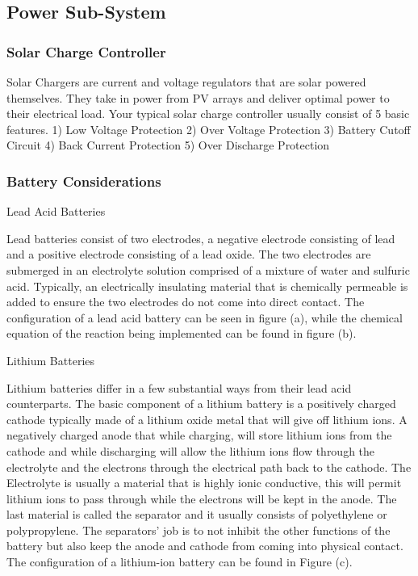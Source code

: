 \subsection{Power Sub-System}
\subsubsection{Solar Charge Controller}
Solar Chargers are current and voltage regulators that are solar powered themselves. They take in power from PV arrays and deliver optimal power to their electrical load. Your typical solar charge controller usually consist of 5 basic features.
1) Low Voltage Protection
2) Over Voltage Protection
3) Battery Cutoff Circuit
4) Back Current Protection
5) Over Discharge Protection
\subsubsection{Battery Considerations}
Lead Acid Batteries 

Lead batteries consist of two electrodes, a negative electrode consisting of lead and a positive electrode consisting of a lead oxide. The two electrodes are submerged in an electrolyte solution comprised of a mixture of water and sulfuric acid. Typically, an electrically insulating material that is chemically permeable is added to ensure the two electrodes do not come into direct contact. The configuration of a lead acid battery can be seen in figure (a), while the chemical equation of the reaction being implemented can be found in figure (b).

Lithium Batteries 

Lithium batteries differ in a few substantial ways from their lead acid counterparts. The basic component of a lithium battery is a positively charged cathode typically made of a lithium oxide metal that will give off lithium ions. A negatively charged anode that while charging, will store lithium ions from the cathode and while discharging will allow the lithium ions flow through the electrolyte and the electrons through the electrical path back to the cathode. The Electrolyte is usually a material that is highly ionic conductive, this will permit lithium ions to pass through while the electrons will be kept in the anode. The last material is called the separator and it usually consists of polyethylene or polypropylene. The separators' job is to not inhibit the other functions of the battery but also keep the anode and cathode from coming into physical contact. The configuration of a lithium-ion battery can be found in Figure (c). 

